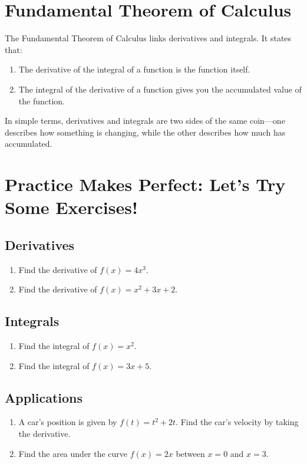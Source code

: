 \section{Fundamental Theorem of Calculus}
The Fundamental Theorem of Calculus links derivatives and integrals. It states that:
\begin{enumerate}
    \item The derivative of the integral of a function is the function itself.
    \item The integral of the derivative of a function gives you the accumulated value of the function.
\end{enumerate}
In simple terms, derivatives and integrals are two sides of the same coin—one describes how something is changing, while the other describes how much has accumulated.

\section{Practice Makes Perfect: Let’s Try Some Exercises!}
\subsection{Derivatives}
\begin{enumerate}
    \item Find the derivative of \( f(x) = 4x^3 \).
    \item Find the derivative of \( f(x) = x^2 + 3x + 2 \).
\end{enumerate}

\subsection{Integrals}
\begin{enumerate}
    \item Find the integral of \( f(x) = x^2 \).
    \item Find the integral of \( f(x) = 3x + 5 \).
\end{enumerate}

\subsection{Applications}
\begin{enumerate}
    \item A car’s position is given by \( f(t) = t^2 + 2t \). Find the car’s velocity by taking the derivative.
    \item Find the area under the curve \( f(x) = 2x \) between \( x = 0 \) and \( x = 3 \).
\end{enumerate}

